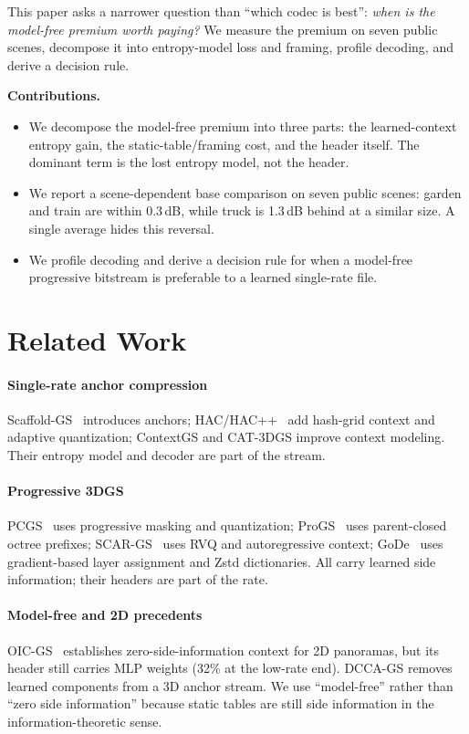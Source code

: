\documentclass[conference]{IEEEtran}
\newcommand{\dcca}{DCCA-GS}
\begin{document}
This paper asks a narrower question than ``which codec is best'': \emph{when is the model-free premium worth paying?} We measure the premium on seven public scenes, decompose it into entropy-model loss and framing, profile decoding, and derive a decision rule.

\noindent\textbf{Contributions.}
\begin{itemize}
  \item We decompose the model-free premium into three parts: the learned-context entropy gain, the static-table/framing cost, and the header itself. The dominant term is the lost entropy model, not the header.
  \item We report a scene-dependent base comparison on seven public scenes: garden and train are within 0.3\,dB, while truck is 1.3\,dB behind at a similar size. A single average hides this reversal.
  \item We profile decoding and derive a decision rule for when a model-free progressive bitstream is preferable to a learned single-rate file.
\end{itemize}

\section{Related Work}
\label{sec:related}
\paragraph{Single-rate anchor compression}
Scaffold-GS~\cite{lu2024} introduces anchors; HAC/HAC++~\cite{chen2024,chen2025} add hash-grid context and adaptive quantization; ContextGS and CAT-3DGS improve context modeling. Their entropy model and decoder are part of the stream.

\paragraph{Progressive 3DGS}
PCGS~\cite{chen2026pcgs} uses progressive masking and quantization; ProGS~\cite{tang2026progs} uses parent-closed octree prefixes; SCAR-GS~\cite{revilla2026scar} uses RVQ and autoregressive context; GoDe~\cite{disario2025gode} uses gradient-based layer assignment and Zstd dictionaries. All carry learned side information; their headers are part of the rate.

\paragraph{Model-free and 2D precedents}
OIC-GS~\cite{oicgs2026} establishes zero-side-information context for 2D panoramas, but its header still carries MLP weights (32\% at the low-rate end). \dcca{} removes learned components from a 3D anchor stream. We use ``model-free'' rather than ``zero side information'' because static tables are still side information in the information-theoretic sense.
\end{document}
